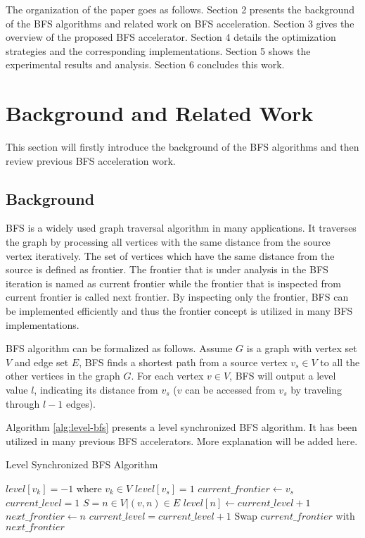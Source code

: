 \documentclass[12pt]{article} %
\begin{document}
The organization of the paper goes as follows. Section 2 presents the background of the BFS 
algorithms and related work on BFS acceleration. Section 3 gives the overview of the 
proposed BFS accelerator. Section 4 details the optimization strategies and the corresponding 
implementations. Section 5 shows the experimental results and analysis. Section 6 concludes 
this work.

\section{Background and Related Work}
This section will firstly introduce the background of the BFS algorithms and then 
review previous BFS acceleration work.

\subsection{Background}
BFS is a widely used graph traversal algorithm in many applications. 
It traverses the graph by processing all vertices with the same distance from the 
source vertex iteratively. The set of vertices which have the same distance from the 
source is defined as frontier. The frontier that is under analysis in the BFS iteration 
is named as current frontier while the frontier that is inspected from current frontier 
is called next frontier. By inspecting only the frontier, BFS can be implemented efficiently 
and thus the frontier concept is utilized in many BFS implementations.

BFS algorithm can be formalized as follows. Assume $G$ is a graph with vertex 
set $V$ and edge set $E$, BFS finds a shortest path from a source vertex
$v_s \in V$ to all the other vertices in the graph $G$. For each vertex $v \in V$, 
BFS will output a level value $l$, indicating its distance from $v_s$ ($v$ can be accessed 
from $v_s$ by traveling through $l - 1$ edges). 

Algorithm \ref{alg:level-bfs} presents a level synchronized BFS algorithm. It has been utilized in many 
previous BFS accelerators. More explanation will be added here. 
\begin{algorithm}
	\caption{Level Synchronized BFS Algorithm} \label{alg:level-bfs}
	\begin{algorithmic}[1]
		\State $level[v_k] = -1$ where $v_k \in V$
		\State $level[v_s] = 1$
		\State $current\_frontier \gets v_s$
		\State $current\_level = 1$
		\State $S = {n \in V | (v, n) \in E}$
		\State $level[n] \gets current\_level + 1$
		\State $next\_frontier \gets n$
		\EndIf
		\EndFor
		\EndFor
		\State $current\_level = current\_level + 1$
		\State Swap $current\_frontier$ with $next\_frontier$
		\EndWhile
		\EndProcedure
	\end{algorithmic}
\end{algorithm}
\end{document}
